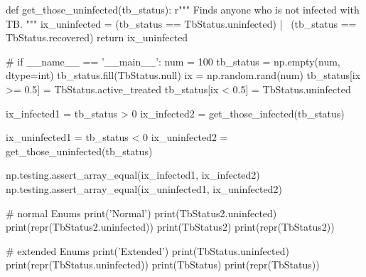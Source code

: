 \documentclass[12pt]{article}
\begin{document}
\begin{Python}
def get_those_uninfected(tb_status):
    r"""
    Finds anyone who is not infected with TB.
    """
    ix_uninfected = (tb_status == TbStatus.uninfected) | \
        (tb_status == TbStatus.recovered)
    return ix_uninfected

#%
if __name__ == '__main__':
    num = 100
    tb_status = np.empty(num, dtype=int)
    tb_status.fill(TbStatus.null)
    ix = np.random.rand(num)
    tb_status[ix >= 0.5] = TbStatus.active_treated
    tb_status[ix <  0.5] = TbStatus.uninfected


    ix_infected1 = tb_status > 0
    ix_infected2 = get_those_infected(tb_status)

    ix_uninfected1 = tb_status < 0
    ix_uninfected2 = get_those_uninfected(tb_status)

    np.testing.assert_array_equal(ix_infected1, ix_infected2)
    np.testing.assert_array_equal(ix_uninfected1, ix_uninfected2)

    # normal Enums
    print('Normal')
    print(TbStatus2.uninfected)
    print(repr(TbStatus2.uninfected))
    print(TbStatus2)
    print(repr(TbStatus2))

    # extended Enums
    print('Extended')
    print(TbStatus.uninfected)
    print(repr(TbStatus.uninfected))
    print(TbStatus)
    print(repr(TbStatus))
\end{Python}
\end{document}
